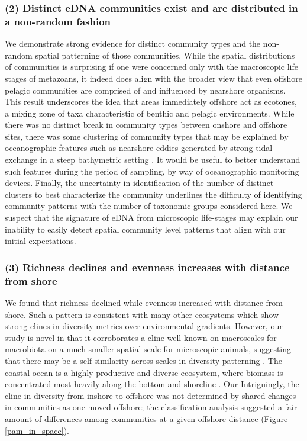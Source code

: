 \documentclass[11pt,letterpaper]{article} %
\begin{document}
\subsubsection*{(2) Distinct eDNA communities exist and are distributed in a non-random fashion}
 We demonstrate strong evidence for distinct community types and the non-random spatial patterning of those communities. While the spatial distributions of communities is surprising if one were concerned only with the macroscopic life stages of metazoans, it indeed does align with the broader view that even offshore pelagic communities are comprised of and influenced by nearshore organisms. This result underscores the idea that areas immediately offshore act as ecotones, a mixing zone of taxa characteristic of benthic and pelagic environments. While there was no distinct break in community types between onshore and offshore sites, there was some clustering of community types that may be explained by oceanographic features such as nearshore eddies generated by strong tidal exchange in a steep bathymetric setting \citep{Yang2010}. It would be useful to better understand such features during the period of sampling, by way of oceanographic monitoring devices.
Finally, the uncertainty in identification of the number of distinct clusters to best characterize the community underlines the difficulty of identifying community patterns with the number of taxonomic groups considered here. We suspect that the signature of eDNA from microscopic life-stages may explain our inability to easily detect spatial community level patterns that align with our initial expectations.

 \subsubsection*{(3) Richness declines and evenness increases with distance from shore}
We found that richness declined while evenness increased with distance from shore.
Such a pattern is consistent with many other ecosystems which show strong clines in diversity metrics over environmental gradients.
However, our study is novel in that it corroborates a cline well-known on macroscales for macrobiota on a much smaller spatial scale for microscopic animals, suggesting that there may be a self-similarity across scales in diversity patterning \citep{Levin1992}.
The coastal ocean is a highly productive and diverse ecosystem, where biomass is concentrated most heavily along the bottom and shoreline \citep{Ray1988}.
Our
Intriguingly, the cline in diversity from inshore to offshore was not determined by shared changes in communities as one moved offshore; the classification analysis suggested a fair amount of differences among communities at a given offshore distance (Figure \ref{pam_in_space}).
\end{document}
